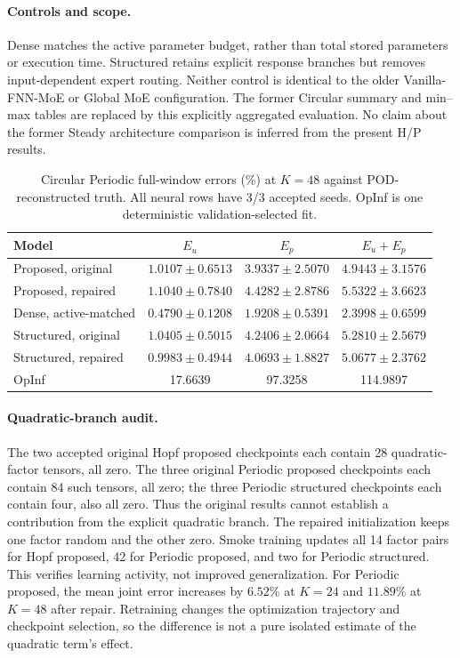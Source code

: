 \documentclass{article}
\begin{document}
\paragraph{Controls and scope.}
Dense matches the active parameter budget, rather than total stored
parameters or execution time. Structured retains explicit response
branches but removes input-dependent expert routing. Neither control
is identical to the older Vanilla-FNN-MoE or Global MoE configuration.
The former Circular summary and min--max tables are replaced by this
explicitly aggregated evaluation. No claim about the former Steady
architecture comparison is inferred from the present H/P results.



\begin{table}[H]
\centering
\caption{Circular Periodic full-window errors (\%) at $K=48$ against
POD-reconstructed truth. All neural rows have 3/3 accepted seeds.
OpInf is one deterministic validation-selected fit.}
\label{tab:circular_full}
\small
\setlength{\tabcolsep}{3pt}
\begin{tabular}{@{}lccc@{}}
\toprule
Model & $E_u$ & $E_p$ & $E_u+E_p$\\
\midrule
Proposed, original & $1.0107\pm0.6513$ & $3.9337\pm2.5070$ & $4.9443\pm3.1576$\\
Proposed, repaired & $1.1040\pm0.7840$ & $4.4282\pm2.8786$ & $5.5322\pm3.6623$\\
Dense, active-matched & $\mathbf{0.4790\pm0.1208}$ & $\mathbf{1.9208\pm0.5391}$ & $\mathbf{2.3998\pm0.6599}$\\
Structured, original & $1.0405\pm0.5015$ & $4.2406\pm2.0664$ & $5.2810\pm2.5679$\\
Structured, repaired & $0.9983\pm0.4944$ & $4.0693\pm1.8827$ & $5.0677\pm2.3762$\\
OpInf & 17.6639 & 97.3258 & 114.9897\\
\bottomrule
\end{tabular}
\end{table}



\paragraph{Quadratic-branch audit.}
The two accepted original Hopf proposed checkpoints each contain 28
quadratic-factor tensors, all zero. The three original Periodic
proposed checkpoints each contain 84 such tensors, all zero; the three
Periodic structured checkpoints each contain four, also all zero.
Thus the original results cannot establish a contribution from the
explicit quadratic branch. The repaired initialization keeps one factor
random and the other zero. Smoke training updates all 14 factor pairs
for Hopf proposed, 42 for Periodic proposed, and two for Periodic
structured. This verifies learning activity, not improved generalization.
For Periodic proposed, the mean joint error increases by $6.52\%$ at
$K=24$ and $11.89\%$ at $K=48$ after repair. Retraining changes the
optimization trajectory and checkpoint selection, so the difference is
not a pure isolated estimate of the quadratic term's effect.
\end{document}
